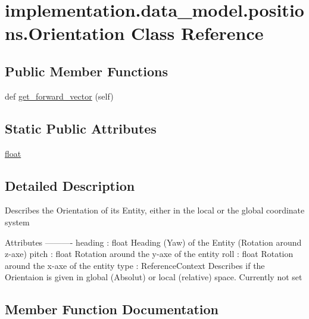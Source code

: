 \hypertarget{classimplementation_1_1data__model_1_1positions_1_1_orientation}{}\section{implementation.\+data\+\_\+model.\+positions.\+Orientation Class Reference}
\label{classimplementation_1_1data__model_1_1positions_1_1_orientation}
\subsection*{Public Member Functions}
\begin{DoxyCompactItemize}
\item 
def \hyperlink{classimplementation_1_1data__model_1_1positions_1_1_orientation_a49cf0a95a5118a8d4a8e7c502d36dc14}{get\+\_\+forward\+\_\+vector} (self)
\end{DoxyCompactItemize}
\subsection*{Static Public Attributes}
\begin{DoxyCompactItemize}
\item 
\hyperlink{classimplementation_1_1data__model_1_1positions_1_1_orientation_ab6e44ad9fcf49a139d793cdfa4009005}{float}
\end{DoxyCompactItemize}


\subsection{Detailed Description}
\begin{DoxyVerb}Describes the Orientation of its Entity, either in the local or the global coordinate system

Attributes
----------
heading : float
    Heading (Yaw) of the Entity (Rotation around z-axe)
pitch : float
    Rotation around the y-axe of the entity
roll : float
    Rotation around the x-axe of the entity
type : ReferenceContext
    Describes if the Orientaion is given in global (Absolut) or local (relative) space.
    Currently not set
\end{DoxyVerb}
 

\subsection{Member Function Documentation}
\mbox{\label{classimplementation_1_1data__model_1_1positions_1_1_orientation_a49cf0a95a5118a8d4a8e7c502d36dc14}} 

